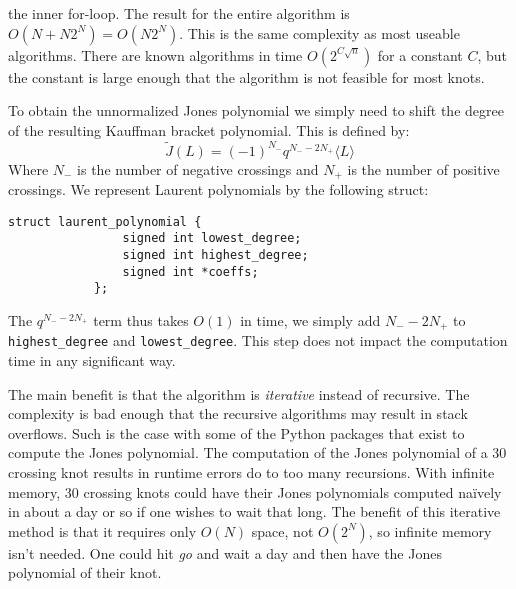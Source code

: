\documentclass{article}
\theoremstyle{plain}
\begin{document}
        the inner for-loop. The result for the entire algorithm is
        $O(N+N2^{N})=O(N2^{N})$. This is the same complexity as most useable
        algorithms. There are known algorithms in time $O(2^{C\sqrt{n}})$ for a
        constant $C$, but the constant is large enough that the algorithm is
        not feasible for most knots.
        \par\hfill\par
        To obtain the unnormalized Jones polynomial we simply need to shift
        the degree of the resulting Kauffman bracket polynomial. This is
        defined by:
        \begin{equation}
            \tilde{J}(L)=(-1)^{N_{-}}q^{N_{-}-2N_{+}}\langle{L}\rangle
        \end{equation}
        Where $N_{-}$ is the number of negative crossings and $N_{+}$ is the
        number of positive crossings. We represent Laurent polynomials by the
        following struct:
        \begin{lstlisting}[style=CStyle, gobble=12]
            struct laurent_polynomial {
                signed int lowest_degree;
                signed int highest_degree;
                signed int *coeffs;
            };
        \end{lstlisting}
        The $q^{N_{-}-2N_{+}}$ term thus takes $O(1)$ in time, we simply
        add $N_{-}-2N_{+}$ to \texttt{highest\_degree} and
        \texttt{lowest\_degree}. This step does not impact the computation time
        in any significant way.
        \par\hfill\par
        The main benefit is that the algorithm is \textit{iterative} instead of
        recursive. The complexity is bad enough that the recursive
        algorithms may result in stack overflows. Such is the case with some of
        the Python packages that exist to compute the Jones polynomial. The
        computation of the Jones polynomial of a 30 crossing knot results in
        runtime errors do to too many recursions. With infinite memory, 30
        crossing knots could have their Jones polynomials computed na\"{i}vely
        in about a day or so if one wishes to wait that long. The benefit of
        this iterative method is that it requires only $O(N)$ space,
        not $O(2^{N})$, so infinite memory isn't needed. One could hit
        \textit{go} and wait a day and then have the Jones polynomial of their
        knot.
\end{document}
